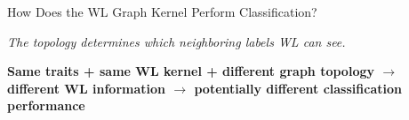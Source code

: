 \documentclass[aspectratio=169, 11pt]{beamer}
\begin{document}
\begin{frame}{How Does the WL Graph Kernel Perform Classification?}
    \vspace{0.1cm}
    \begin{center}
    \end{center}

    \vspace{0.12cm}
    \begin{center}
    {\scriptsize\itshape The topology determines which neighboring labels WL
    can see.}

    \vspace{0.1cm}
    {\footnotesize\bfseries Same traits + same WL kernel + different graph
    topology $\rightarrow$ different WL information $\rightarrow$ potentially
    different classification performance}
    \end{center}
\end{frame}
\end{document}
